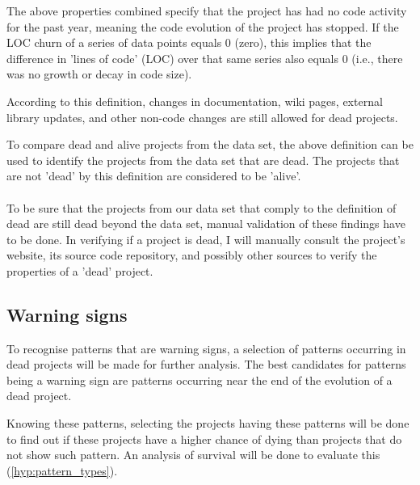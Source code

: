 \noindent
The above properties combined specify that the project has had no code activity
for the past year, meaning the code evolution of the project has stopped. If the
LOC churn of a series of data points equals 0 (zero), this implies that the
difference in 'lines of code' (LOC) over that same series also equals 0 (i.e.,
there was no growth or decay in code size).

According to this definition, changes in documentation, wiki pages, external
library updates, and other non-code changes are still allowed for dead
projects.

To compare dead and alive projects from the data set, the above definition can
be used to identify the projects from the data set that are dead. The projects
that are not 'dead' by this definition are considered to be 'alive'.

\paragraph{}
To be sure that the projects from our data set that comply to the definition of
dead are still dead beyond the data set, manual validation of these findings
have to be done. In verifying if a project is dead, I will manually consult the
project's website, its source code repository, and possibly other sources to
verify the properties of a 'dead' project.

\subsection{Warning signs}
To recognise patterns that are warning signs, a selection of patterns occurring
in dead projects will be made for further analysis. The best candidates for
patterns being a warning sign are patterns occurring near the end of the
evolution of a dead project.

Knowing these patterns, selecting the projects having these patterns will be
done to find out if these projects have a higher chance of dying than projects
that do not show such pattern. An analysis of survival will be done to evaluate
this (\ref{hyp:pattern_types}).

